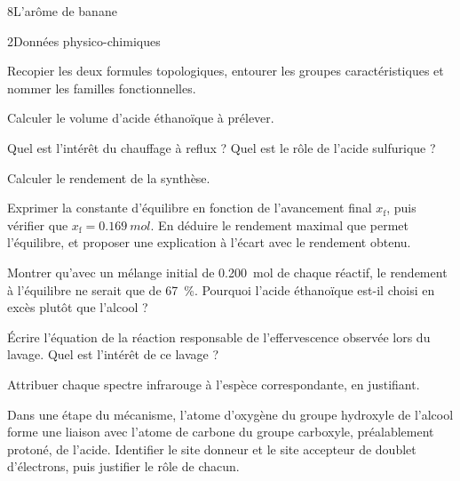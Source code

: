 \begin{exoBac}{8}{L'arôme de banane}
\begin{docu}{2}{Données physico-chimiques}
\end{docu}
\begin{questions}
\item Recopier les deux formules topologiques, entourer les groupes caractéristiques et nommer les familles fonctionnelles.
\item Calculer le volume d'acide éthanoïque à prélever.
\item Quel est l'intérêt du chauffage à reflux ? Quel est le rôle de l'acide sulfurique ?
\item Calculer le rendement de la synthèse.
\item Exprimer la constante d'équilibre en fonction de l'avancement final $x_\mathrm{f}$, puis vérifier que $x_\mathrm{f}=\qty{0,169}{mol}$. En
déduire le rendement maximal que permet l'équilibre, et proposer une explication à l'écart avec le rendement obtenu.
\item \initiative Montrer qu'avec un mélange initial de \qty{0,200}{mol} de chaque réactif, le rendement à l'équilibre ne serait
que de 67~\%. Pourquoi l'acide éthanoïque est-il choisi en excès plutôt que l'alcool ?
\item Écrire l'équation de la réaction responsable de l'effervescence observée lors du lavage. Quel est l'intérêt de ce
lavage ?
\item Attribuer chaque spectre infrarouge à l'espèce correspondante, en justifiant.
\item Dans une étape du mécanisme, l'atome d'oxygène du groupe hydroxyle de l'alcool forme une liaison avec l'atome de
carbone du groupe carboxyle, préalablement protoné, de l'acide. Identifier le site donneur et le site accepteur de doublet
d'électrons, puis justifier le rôle de chacun.
\end{questions}
\end{exoBac}

